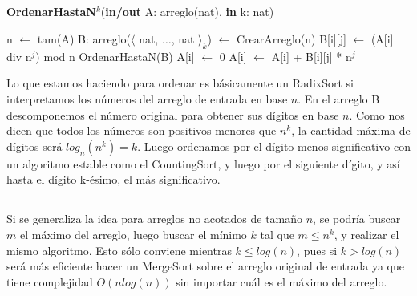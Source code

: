 \subsection{}

\begin{algorithm}[H]
\caption{
    \textbf{OrdenarHastaN$^k$}(\textbf{in/out} A: arreglo(nat), \textbf{in} k: nat)
}
\begin{algorithmic}[1]
    \State n $\gets$ tam(A)
    \State B: arreglo($\langle$ nat, $\dots$, nat $\rangle_k$) $\gets$ CrearArreglo(n) 
     
         
            \State B[i][j] $\gets$ (A[i] div n$^j$) mod n
        \EndFor
    \EndFor
     
        \State OrdenarHastaN(B) 
    \EndFor
     
        \State A[i] $\gets$ 0
         
            \State A[i] $\gets$ A[i] + B[i][j] * n$^j$
        \EndFor
    \EndFor
\end{algorithmic}
\end{algorithm}

Lo que estamos haciendo para ordenar es básicamente un RadixSort si interpretamos los números del arreglo de entrada en base $n$. En el arreglo B descomponemos el número original para obtener sus dígitos en base $n$. Como nos dicen que todos los números son positivos menores que $n^k$, la cantidad máxima de dígitos será $log_n(n^k) = k$. Luego ordenamos por el dígito menos significativo con un algoritmo estable como el CountingSort, y luego por el siguiente dígito, y así hasta el dígito k-ésimo, el más significativo.

\subsection{}

Si se generaliza la idea para arreglos no acotados de tamaño $n$, se podría buscar $m$ el máximo del arreglo, luego buscar el mínimo $k$ tal que $m \leq n^k$, y realizar el mismo algoritmo. Esto sólo conviene mientras $k \leq log(n)$, pues si $k > log(n)$ será más eficiente hacer un MergeSort sobre el arreglo original de entrada ya que tiene complejidad $O(n log(n))$ sin importar cuál es el máximo del arreglo.
